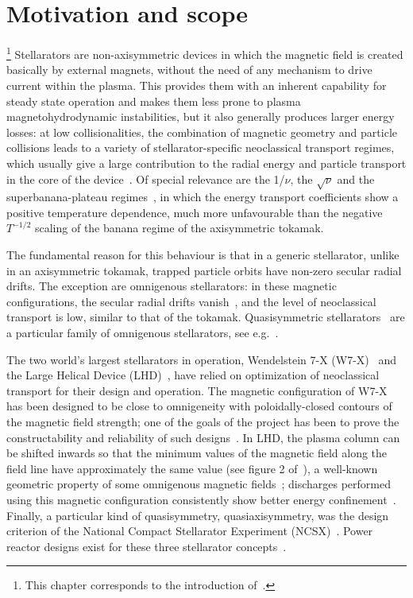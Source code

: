 \chapter{Motivation and scope}\label{CHAP_MOT}

\footnote{This chapter corresponds to the introduction of~\citep{velasco2019knosos}.}
Stellarators are non-axisymmetric devices in which the magnetic field is created basically by external magnets, without the need of any mechanism to drive current within the plasma. This provides them with an inherent capability for steady state operation and makes them less prone to plasma magnetohydrodynamic instabilities, but it also generally produces larger energy losses: at low collisionalities, the combination of magnetic geometry and particle collisions leads to a variety of stellarator-specific neoclassical transport regimes, which usually  give a large contribution to the radial energy and particle transport in the core of the device~\citep{dinklage2013ncval,dinklage2018np}. Of special relevance are the 1/$\nu$, the $\sqrt{\nu}$ and the superbanana-plateau regimes~\citep{hokulsrud1986neo,beidler2011icnts,calvo2017sqrtnu}, in which the energy transport coefficients show a positive temperature dependence, much more unfavourable than the negative $T^{-1/2}$ scaling of the banana regime of the axisymmetric tokamak. 

The fundamental reason for this behaviour is that in a generic stellarator, unlike in an axisymmetric tokamak, trapped particle orbits have non-zero secular radial drifts. The exception are omnigenous stellarators: in these magnetic configurations, the secular radial drifts vanish~\citep{cary1997omni,parra2015omni}, and the level of neoclassical transport is low, similar to that of the tokamak. Quasisymmetric stellarators~\citep{boozer1983qs} are a particular family of omnigenous stellarators, see e.g.~\citep{landreman2012omni}.

The two world's largest stellarators in operation, Wendelstein 7-X (W7-X)~\citep{klinger2017op11,wolf2017op11} and the Large Helical Device (LHD)~\citep{takeiri2017iaea}, have relied on optimization of neoclassical transport for their design and operation. The magnetic configuration of W7-X has been designed to be close to omnigeneity with poloidally-closed contours of the magnetic field strength; one of the goals of the project has been to prove the constructability and reliability of such designs~\citep{sunnpedersen2016nature}. In LHD, the plasma column can be shifted inwards so that the minimum values of the magnetic field along the field line have approximately the same value (see figure 2 of~\citep{beidler2011icnts}), a well-known geometric property of some omnigenous magnetic fields~\citep{mynick1982omni,landreman2012omni}; discharges performed using this magnetic configuration consistently show better energy confinement~\citep{yamada2005taue}. Finally, a particular kind of quasisymmetry, quasiaxisymmetry, was the design criterion of the National Compact Stellarator Experiment (NCSX)~\citep{zarnstorff2001ncsx}. Power reactor designs exist for these three stellarator concepts~\citep{sagara2010reactors}.

